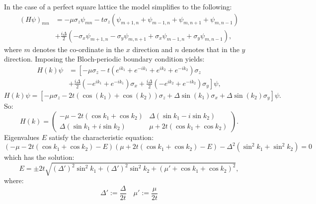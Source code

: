 \documentclass[a4paper]{article}
\begin{document}
In the case of a perfect square lattice the model simplifies to the following: 
\begin{equation}
\begin{split}
	(H \psi)_{mn} &= - \mu \sigma_z \psi_{mn} - t \sigma_z \left( \psi_{m+1,n} + \psi_{m-1,n} + \psi_{m,n+1} + \psi_{m,n-1} \right) \\
	&+ \frac{ i \Delta }{ 2 } \left( - \sigma_x \psi_{m+1,n} - \sigma_y \psi_{m,n+1} + \sigma_x \psi_{m-1,n} + \sigma_y \psi_{m,n-1} \right),
\end{split}
\end{equation}
where $m$ denotes the co-ordinate in the $x$ direction and $n$ denotes that in the $y$ direction. Imposing the Bloch-periodic boundary condition yields:
\begin{equation}
\begin{split}
	H(k) \psi &= \left[ - \mu \sigma_z - t \left( e^{i k_1} + e^{- i k_1} + e^{i k_2} + e^{- i k_2} \right) \sigma_z \right. \\
	&\left. + \frac{ i \Delta }{ 2 } \left( -  e^{i k_1} + e^{- i k_1} \right) \sigma_x + \frac{ i \Delta }{ 2 } \left( - e^{i k_2} + e^{- i k_2} \right) \sigma_y \right] \psi,
\end{split}
\end{equation}
\begin{equation}
	H(k) \psi = \left[ - \mu \sigma_z - 2 t \left( \cos(k_1) + \cos(k_2) \right) \sigma_z + \Delta \sin(k_1) \sigma_x + \Delta \sin(k_2) \sigma_y \right] \psi. 
\end{equation}
So:
\begin{equation}
	H(k) = \begin{pmatrix} - \mu - 2 t ( \cos k_1 + \cos k_2 ) & \Delta ( \sin k_1 - i \sin k_2 ) \\ \Delta ( \sin k_1 + i \sin k_2 ) & \mu + 2 t ( \cos k_1 + \cos k_2 ) \end{pmatrix}.
\end{equation}
Eigenvalues $E$ satisfy the characteristic equation:
\begin{equation}
	( - \mu - 2 t ( \cos k_1 + \cos k_2 ) - E )( \mu + 2 t ( \cos k_1 + \cos k_2 ) - E ) - \Delta^2 ( \sin^2 k_1 + \sin^2 k_2 ) = 0
\end{equation}
which has the solution:
\begin{equation}
	E = \pm 2 t \sqrt{ (\Delta')^2 \sin^2 k_1 + (\Delta')^2 \sin^2 k_2 + \left( \mu' + \cos k_1 + \cos k_2 \right)^2 },
\end{equation}
where:
\begin{equation}
	\Delta' := \frac{\Delta}{2 t} \quad \mu' := \frac{ \mu }{ 2 t }
\end{equation}
\end{document}

